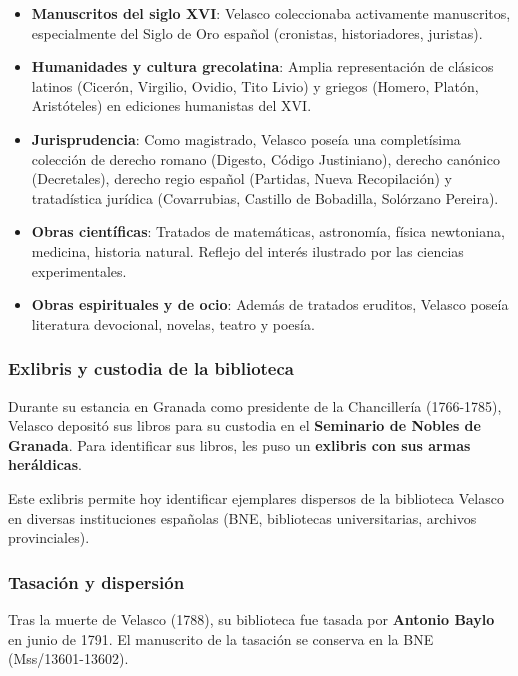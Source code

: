 \documentclass[11pt,a4paper]{article}
\begin{document}
\begin{itemize}
\item \textbf{Manuscritos del siglo XVI}: Velasco coleccionaba activamente manuscritos, especialmente del Siglo de Oro español (cronistas, historiadores, juristas).

\item \textbf{Humanidades y cultura grecolatina}: Amplia representación de clásicos latinos (Cicerón, Virgilio, Ovidio, Tito Livio) y griegos (Homero, Platón, Aristóteles) en ediciones humanistas del XVI.

\item \textbf{Jurisprudencia}: Como magistrado, Velasco poseía una completísima colección de derecho romano (Digesto, Código Justiniano), derecho canónico (Decretales), derecho regio español (Partidas, Nueva Recopilación) y tratadística jurídica (Covarrubias, Castillo de Bobadilla, Solórzano Pereira).

\item \textbf{Obras científicas}: Tratados de matemáticas, astronomía, física newtoniana, medicina, historia natural. Reflejo del interés ilustrado por las ciencias experimentales.

\item \textbf{Obras espirituales y de ocio}: Además de tratados eruditos, Velasco poseía literatura devocional, novelas, teatro y poesía.
\end{itemize}

\subsubsection{Exlibris y custodia de la biblioteca}

Durante su estancia en Granada como presidente de la Chancillería (1766-1785), Velasco depositó sus libros para su custodia en el \textbf{Seminario de Nobles de Granada}. Para identificar sus libros, les puso un \textbf{exlibris con sus armas heráldicas}.

Este exlibris permite hoy identificar ejemplares dispersos de la biblioteca Velasco en diversas instituciones españolas (BNE, bibliotecas universitarias, archivos provinciales).

\subsubsection{Tasación y dispersión}

Tras la muerte de Velasco (1788), su biblioteca fue tasada por \textbf{Antonio Baylo} en junio de 1791. El manuscrito de la tasación se conserva en la BNE (Mss/13601-13602).
\end{document}
